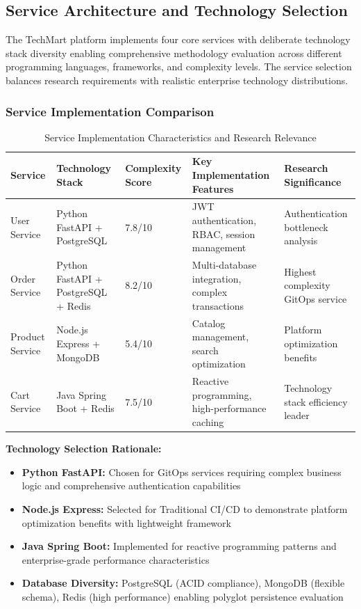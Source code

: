 \subsection{Service Architecture and Technology Selection}

The TechMart platform implements four core services with deliberate technology stack diversity enabling comprehensive methodology evaluation across different programming languages, frameworks, and complexity levels. The service selection balances research requirements with realistic enterprise technology distributions.

\subsubsection{Service Implementation Comparison}

\begin{table}[H]
\centering
\caption{Service Implementation Characteristics and Research Relevance}
\label{tab:service-implementation-comparison}
\begin{tabular}{|p{2.5cm}|p{3cm}|p{2cm}|p{3cm}|p{3.5cm}|}
\hline
\textbf{Service} & \textbf{Technology Stack} & \textbf{Complexity Score} & \textbf{Key Implementation Features} & \textbf{Research Significance} \\
\hline
User Service & Python FastAPI + PostgreSQL & 7.8/10 & JWT authentication, RBAC, session management & Authentication bottleneck analysis \\
\hline
Order Service & Python FastAPI + PostgreSQL + Redis & 8.2/10 & Multi-database integration, complex transactions & Highest complexity GitOps service \\
\hline
Product Service & Node.js Express + MongoDB & 5.4/10 & Catalog management, search optimization & Platform optimization benefits \\
\hline
Cart Service & Java Spring Boot + Redis & 7.5/10 & Reactive programming, high-performance caching & Technology stack efficiency leader \\
\hline
\end{tabular}
\end{table}

\textbf{Technology Selection Rationale:}
\begin{itemize}
\item \textbf{Python FastAPI:} Chosen for GitOps services requiring complex business logic and comprehensive authentication capabilities
\item \textbf{Node.js Express:} Selected for Traditional CI/CD to demonstrate platform optimization benefits with lightweight framework
\item \textbf{Java Spring Boot:} Implemented for reactive programming patterns and enterprise-grade performance characteristics
\item \textbf{Database Diversity:} PostgreSQL (ACID compliance), MongoDB (flexible schema), Redis (high performance) enabling polyglot persistence evaluation
\end{itemize}

